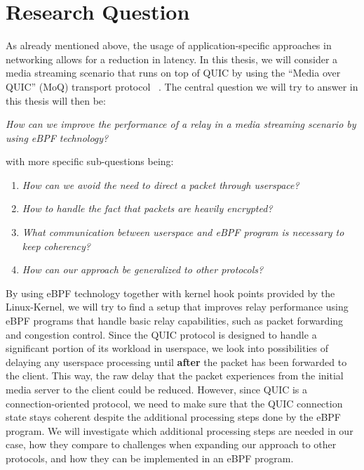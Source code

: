 \section{Research Question}\label{sec:research_question}

As already mentioned above, the usage of application-specific approaches in networking allows for a reduction in latency.
In this thesis, we will consider a media streaming scenario that runs on top of QUIC by using the ``Media over QUIC'' (MoQ) transport protocol
~\parencite{draft-moqtransport}.
The central question we will try to answer in this thesis will then be:
\vspace{0.5cm}
\begin{center}
    \textit{How can we improve the performance of a relay in a media streaming scenario by using eBPF technology?}
\end{center}
\vspace{0.5cm}
with more specific sub-questions being:
\vspace{0.5cm}
\begin{enumerate}
    \item \textit{How can we avoid the need to direct a packet through userspace?}
    \item \textit{How to handle the fact that packets are heavily encrypted?}
    \item \textit{What communication between userspace and eBPF program is necessary to keep coherency?}
    \item \textit{How can our approach be generalized to other protocols?}
\end{enumerate}
\vspace{0.5cm}
By using eBPF technology together with kernel hook points provided by the Linux-Kernel, we will try to find a setup that improves relay 
performance using eBPF programs that handle basic relay capabilities, such as packet forwarding and congestion control.
Since the QUIC protocol is designed to handle a significant portion of its workload in userspace, we look into possibilities of delaying any 
userspace processing until \textbf{after} the packet has been forwarded to the client.
This way, the raw delay that the packet experiences from the initial media server to the client could be reduced. 
However, since QUIC is a connection-oriented protocol, we need to make sure that the QUIC connection state stays 
coherent despite the additional processing steps done by the eBPF program.
We will investigate which additional processing steps are needed in our case, how they compare to challenges when expanding our approach to other protocols, and how they can be implemented in an eBPF program.
